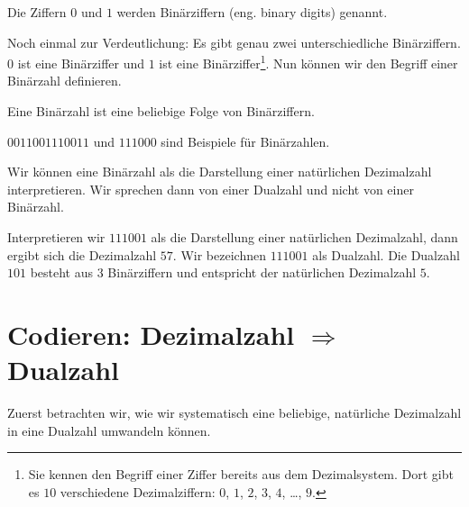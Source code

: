 \begin{definition}[Binärziffer]
Die Ziffern $0$ und $1$ werden Binärziffern (eng. binary digits) genannt.
\end{definition}

Noch einmal zur Verdeutlichung: Es gibt genau zwei unterschiedliche Binärziffern. $0$ ist eine Binärziffer und $1$ ist eine Binärziffer\footnote{Sie kennen den Begriff einer Ziffer bereits aus dem Dezimalsystem. Dort gibt es $10$ verschiedene Dezimalziffern: $0$, $1$, $2$, $3$, $4$, \dots, $9$.}. Nun können wir den Begriff einer Binärzahl definieren.

\begin{definition}[Binärzahl]
Eine Binärzahl ist eine beliebige Folge von Binärziffern.
\end{definition}

\begin{example}
$0011001110011$ und $111000$ sind Beispiele für Binärzahlen.
\end{example}

\begin{definition}[Dualzahlen]
Wir können eine Binärzahl als die Darstellung einer natürlichen Dezimalzahl interpretieren. Wir sprechen dann von einer Dualzahl und nicht von einer Binärzahl.
\end{definition}

\begin{example}
Interpretieren wir $111001$ als die Darstellung einer natürlichen Dezimalzahl, dann ergibt sich die Dezimalzahl $57$. Wir bezeichnen $111001$ als Dualzahl. Die Dualzahl $101$ besteht aus $3$ Binärziffern und entspricht der natürlichen Dezimalzahl $5$.
\end{example}

\section{Codieren: Dezimalzahl $\Rightarrow$ Dualzahl}

Zuerst betrachten wir, wie wir systematisch eine beliebige, natürliche Dezimalzahl in eine Dualzahl umwandeln können.

